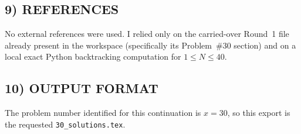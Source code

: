 \subsection*{9) REFERENCES}
No external references were used. I relied only on the carried-over Round~1 file already present in the workspace (specifically its Problem~\#30 section) and on a local exact Python backtracking computation for $1\le N\le 40$.

\subsection*{10) OUTPUT FORMAT}
The problem number identified for this continuation is $x=30$, so this export is the requested \texttt{30\_solutions.tex}.
